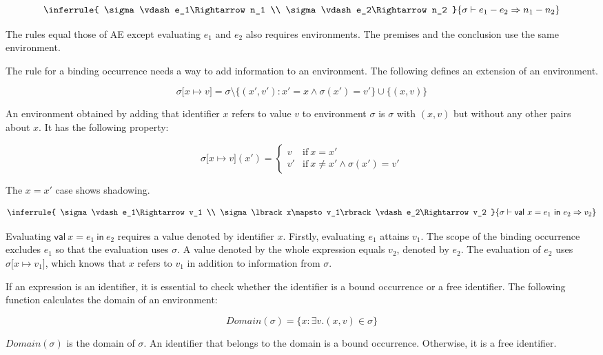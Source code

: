 \[
\inferrule
{ \sigma\vdash e_1\Rightarrow n_1 \\ \sigma\vdash e_2\Rightarrow n_2 }
{ \sigma\vdash e_1-e_2\Rightarrow n_1-n_2 }
\]

The rules equal those of AE except evaluating  \(e_1\) and
\(e_2\) also requires environments. The premises and the conclusion use the same
environment.

The rule for a binding occurrence needs a way to add information to an
environment. The following defines an extension of an environment.

\[
\sigma \lbrack x\mapsto
v\rbrack=\sigma\setminus\{(x',v'):x'=x\land\sigma(x')=v'\}\cup\{(x,v)\}
\]

An environment obtained by adding that identifier \(x\) refers to value \(v\) to
environment \(\sigma\) is \(\sigma\) with \((x,v)\) but without any other pairs
about \(x\). It has the following property:

\[
\sigma \lbrack x\mapsto v\rbrack(x') =
\begin{cases}
v & \text{if}\ x=x' \\
v' & \text{if}\ x\neq x'\land\sigma(x')=v'
\end{cases}
\]

The \(x=x'\) case shows shadowing.

\[
\inferrule
{
  \sigma\vdash e_1\Rightarrow v_1 \\
  \sigma\lbrack x\mapsto v_1\rbrack\vdash e_2\Rightarrow v_2
}
{ \sigma\vdash \textsf{val}\ x=e_1\ \textsf{in}\ e_2\Rightarrow v_2 }
\]

Evaluating \(\textsf{val}\ x=e_1\ \textsf{in}\ e_2\) requires a value denoted by
identifier \(x\). Firstly, evaluating \(e_1\) attains \(v_1\). The scope of the
binding occurrence excludes \(e_1\) so that the evaluation uses \(\sigma\). A
value denoted by the whole expression equals \(v_2\), denoted by \(e_2\). The
evaluation of \(e_2\) uses \(\sigma\lbrack x\mapsto v_1\rbrack\), which knows
that \(x\) refers to \(v_1\) in addition to information from \(\sigma\).

If an expression is an identifier, it is essential to check whether the
identifier is a bound occurrence or a free identifier. The following function
calculates the domain of an environment:

\[
\mathit{Domain}(\sigma)=\{x:\exists v.(x,v)\in\sigma\}
\]

\(\mathit{Domain}(\sigma)\) is the domain of \(\sigma\). An identifier that
belongs to the domain is a bound occurrence. Otherwise, it is a free identifier.

